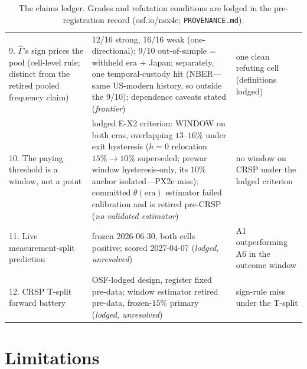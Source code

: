 \documentclass{article}
\begin{document}
\begin{table}[h]
\begin{tabular}{p{}p{}p{}}
9. $\hat\Gamma$'s sign prices the pool (cell-level rule; distinct from the retired pooled frequency claim) & 12/16 strong, 16/16 weak (one-directional); 9/10 out-of-sample = withheld era + Japan; separately, one temporal-custody hit (NBER---same US-modern history, so outside the 9/10); dependence caveats stated (\emph{frontier}) & one clean refuting cell (definitions lodged) \\
10. The paying threshold is a window, not a point & lodged E-X2 criterion: WINDOW on both eras, overlapping $13$--$16\%$ under exit hysteresis ($h{=}0$ relocation $15\% \to 10\%$ superseded; prewar window hysteresis-only, its $10\%$ anchor isolated---PX2e miss); committed $\theta(\mathrm{era})$ estimator failed calibration and is retired pre-CRSP (\emph{no validated estimator}) & no window on CRSP under the lodged criterion \\
11. Live measurement-split prediction & frozen 2026-06-30, both cells positive; scored 2027-04-07 (\emph{lodged, unresolved}) & A1 outperforming A6 in the outcome window \\
12. CRSP T-split forward battery & OSF-lodged design, register fixed pre-data; window estimator retired pre-data, frozen-$15\%$ primary (\emph{lodged, unresolved}) & sign-rule miss under the T-split \\
\bottomrule
\end{tabular}
\caption{The claims ledger. Grades and refutation conditions are lodged
in the pre-registration record (osf.io/nsx4e; \texttt{PROVENANCE.md}).}
\label{tab:ledger}
\end{table}

\section{Limitations}
\label{sec:limitations}
\end{document}
